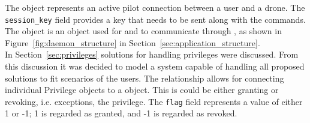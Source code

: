 The  object represents an active pilot connection between a user and a drone.
The \verb+session_key+ field provides a key that needs to be sent along with the commands.
The  object is an object used for  and  to communicate through , as shown in Figure~\ref{fig:daemon_structure} in Section~\ref{sec:application_structure}. \\

In Section~\ref{sec:privileges} solutions for handling privileges were discussed.
From this discussion it was decided to model a system capable of handling all proposed solutions to fit scenarios of the users.
The  relationship allows for connecting individual {Privilege} objects to a  object.
This is could be either granting or revoking, i.e. exceptions, the privilege.
The \verb+flag+ field represents a value of either 1 or -1; 1 is regarded as granted, and -1 is regarded as revoked.







